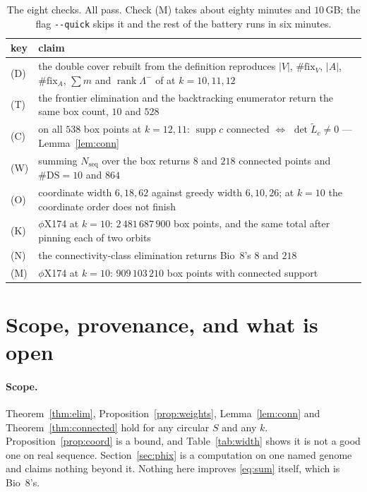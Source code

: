 \documentclass[11pt]{article}
\theoremstyle{plain}
\theoremstyle{definition}
\theoremstyle{remark}
\newcommand{\rank}{\operatorname{rank}}
\newcommand{\supp}{\operatorname{supp}}
\newcommand{\Nseq}{N_{\mathrm{seq}}}
\newcommand{\DS}{\mathrm{DS}}
\newcommand{\Lm}{\Lambda^{-}}
\begin{document}
\begin{table}[t]
\centering
\small
\begin{tabular}{@{}l@{\ \ }p{}@{}}
\toprule
key & claim\\
\midrule
(D) & the double cover rebuilt from the definition reproduces $|V|$, $\#\mathrm{fix}_V$,
$|A|$, $\#\mathrm{fix}_A$, $\sum m$ and $\rank\Lm$ of \cite[Table 1]{Bio8} at $k=10,11,12$\\
(T) & the frontier elimination and the backtracking enumerator return the same box count,
$10$ and $528$\\
(C) & on all $538$ box points at $k=12,11$: $\supp c$ connected $\iff$
$\det\widetilde L_c\ne0$ --- Lemma~\ref{lem:conn}\\
(W) & summing $\Nseq$ over the box returns $8$ and $218$ connected points and
$\#\DS=10$ and $864$\\
(O) & coordinate width $6,18,62$ against greedy width $6,10,26$; at $k=10$ the coordinate
order does not finish\\
(K) & $\phi$X174 at $k=10$: $2\,481\,687\,900$ box points, and the same total after pinning
each of two orbits\\
(N) & the connectivity-class elimination returns Bio~8's $8$ and $218$\\
(M) & $\phi$X174 at $k=10$: $909\,103\,210$ box points with connected support\\
\bottomrule
\end{tabular}
\caption{The eight checks. All pass. Check (M) takes about eighty minutes and $10$\,GB; the
flag \texttt{-{}-quick} skips it and the rest of the battery runs in six minutes.}
\label{tab:checks}
\end{table}

\section{Scope, provenance, and what is open}\label{sec:scope}

\paragraph{Scope.} Theorem~\ref{thm:elim}, Proposition~\ref{prop:weights},
Lemma~\ref{lem:conn} and Theorem~\ref{thm:connected} hold for any circular $S$ and any $k$.
Proposition~\ref{prop:coord} is a bound, and Table~\ref{tab:width} shows it is not a good one
on real sequence. Section~\ref{sec:phix} is a computation on one named genome and claims
nothing beyond it. Nothing here improves \eqref{eq:sum} itself, which is Bio~8's.
\end{document}
